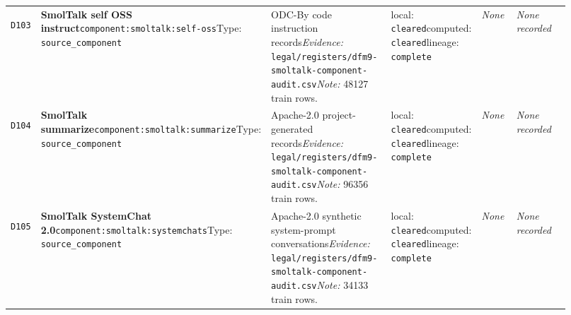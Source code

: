\documentclass[9pt,a4paper]{article}
\newcommand{\depid}[1]{\hypertarget{dep:#1}{\texttt{#1}}}
\begin{document}
\begin{landscape}
\begin{longtable}{@{}L{0.035\linewidth}L{0.185\linewidth}L{0.27\linewidth}L{0.09\linewidth}L{0.10\linewidth}L{0.24\linewidth}@{}}
\depid{D103} & \textbf{SmolTalk self OSS instruct}\newline \nolinkurl{component:smoltalk:self-oss}\newline Type: \texttt{source\_component} & ODC-By code instruction records\newline \textit{Evidence:} \nolinkurl{legal/registers/dfm9-smoltalk-component-audit.csv}\newline \textit{Note:} 48127 train rows. & local: \texttt{cleared}\newline computed: \texttt{cleared}\newline lineage: \texttt{complete} & \textit{None} & \textit{None recorded} \\
\depid{D104} & \textbf{SmolTalk summarize}\newline \nolinkurl{component:smoltalk:summarize}\newline Type: \texttt{source\_component} & Apache-2.0 project-generated records\newline \textit{Evidence:} \nolinkurl{legal/registers/dfm9-smoltalk-component-audit.csv}\newline \textit{Note:} 96356 train rows. & local: \texttt{cleared}\newline computed: \texttt{cleared}\newline lineage: \texttt{complete} & \textit{None} & \textit{None recorded} \\
\depid{D105} & \textbf{SmolTalk SystemChat 2.0}\newline \nolinkurl{component:smoltalk:systemchats}\newline Type: \texttt{source\_component} & Apache-2.0 synthetic system-prompt conversations\newline \textit{Evidence:} \nolinkurl{legal/registers/dfm9-smoltalk-component-audit.csv}\newline \textit{Note:} 34133 train rows. & local: \texttt{cleared}\newline computed: \texttt{cleared}\newline lineage: \texttt{complete} & \textit{None} & \textit{None recorded} \\

\end{longtable}
\end{landscape}
\end{document}
